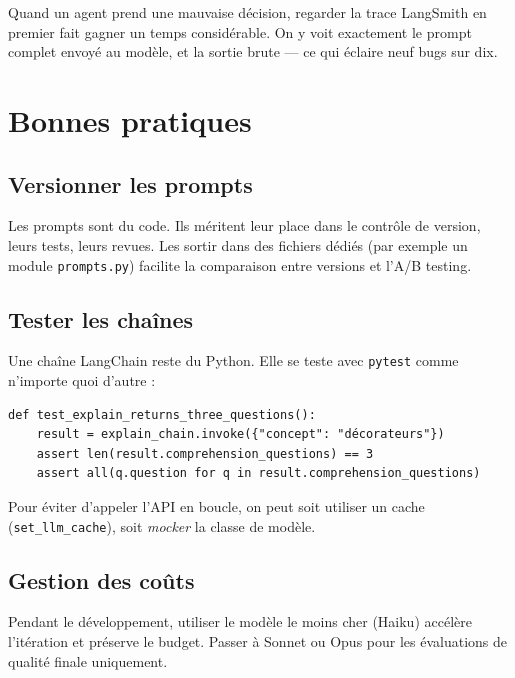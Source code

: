\documentclass[11pt,a4paper]{article}
\begin{document}
\begin{info}
Quand un agent prend une mauvaise décision, regarder la trace LangSmith en premier fait gagner un temps considérable. On y voit exactement le prompt complet envoyé au modèle, et la sortie brute --- ce qui éclaire neuf bugs sur dix.
\end{info}

\section{Bonnes pratiques}

\subsection{Versionner les prompts}

Les prompts sont du code. Ils méritent leur place dans le contrôle de version, leurs tests, leurs revues. Les sortir dans des fichiers dédiés (par exemple un module \texttt{prompts.py}) facilite la comparaison entre versions et l'A/B testing.

\subsection{Tester les chaînes}

Une chaîne LangChain reste du Python. Elle se teste avec \texttt{pytest} comme n'importe quoi d'autre :

\begin{verbatim}
def test_explain_returns_three_questions():
    result = explain_chain.invoke({"concept": "décorateurs"})
    assert len(result.comprehension_questions) == 3
    assert all(q.question for q in result.comprehension_questions)
\end{verbatim}

Pour éviter d'appeler l'API en boucle, on peut soit utiliser un cache (\texttt{set\_llm\_cache}), soit \emph{mocker} la classe de modèle.

\subsection{Gestion des coûts}

Pendant le développement, utiliser le modèle le moins cher (Haiku) accélère l'itération et préserve le budget. Passer à Sonnet ou Opus pour les évaluations de qualité finale uniquement.
\end{document}
